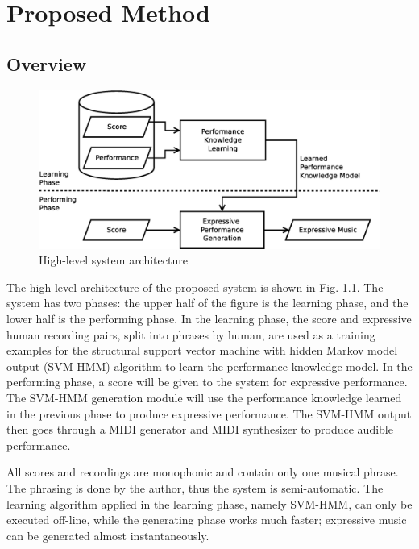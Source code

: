 \chapter{Proposed Method}
\label{chap:proposed}
\section{Overview}
      \begin{figure}[tp]
         \begin{center}
            \includegraphics[width=\textwidth]{fig/high_lev_arch}
         \end{center}
         \caption{High-level system architecture} 
         \label{fig:flow}
      \end{figure}
The high-level architecture of the proposed system is shown in Fig. \ref{fig:flow}. The system has two phases: the upper half of the figure is the learning phase, and the lower half is the performing phase. In the learning phase, the score and expressive human recording pairs, split into phrases by human, are used as a training examples for the structural support vector machine with hidden Markov model output (SVM-HMM) algorithm to learn the performance knowledge model. In the performing phase, a score will be given to the system for expressive performance. The SVM-HMM generation module will use the performance knowledge learned in the previous phase to produce expressive performance. The SVM-HMM output then goes through a MIDI generator and MIDI synthesizer to produce audible performance.

All scores and recordings are monophonic and contain only one musical phrase. The phrasing is done by the author, thus the system is semi-automatic. The learning algorithm applied in the learning phase, namely SVM-HMM, can only be executed off-line, while the generating phase works much faster; expressive music can be generated almost instantaneously. 

